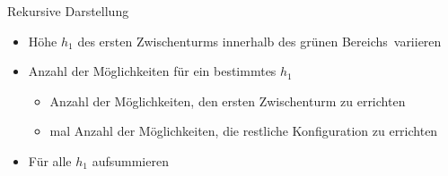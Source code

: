 \begin{frame}{Rekursive Darstellung}
    \begin{itemize}
        \item Höhe $h_1$ des ersten Zwischenturms innerhalb des \glqq grünen Bereichs\grqq\ variieren
        \item Anzahl der Möglichkeiten für ein bestimmtes $h_1$
        \begin{itemize}
            \item Anzahl der Möglichkeiten, den ersten Zwischenturm zu errichten
            \item mal Anzahl der Möglichkeiten, die restliche Konfiguration zu errichten
        \end{itemize}
        \item Für alle $h_1$ aufsummieren
    \end{itemize}
\end{frame}